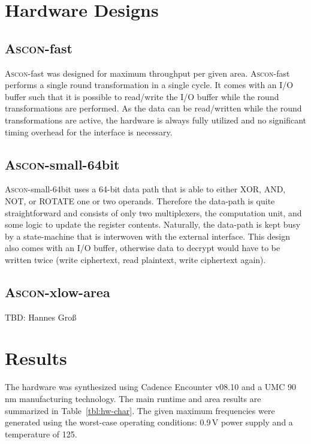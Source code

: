 \documentclass[runningheads]{llncs}
\begin{document}
\section{Hardware Designs}

\subsection{\textsc{Ascon}-fast}

\textsc{Ascon}-fast was designed for maximum throughput per given area.
\textsc{Ascon}-fast performs a single round transformation in a single cycle. It comes with an I/O buffer such that it is possible to read/write the I/O buffer while the round transformations are performed. As the data can be read/written while the round transformations are active, the hardware is always fully utilized and no significant timing overhead for the interface is necessary. 

\subsection{\textsc{Ascon}-small-64bit}

\textsc{Ascon}-small-64bit uses a 64-bit data path that is able to either XOR, AND, NOT, or ROTATE one or two operands. Therefore the data-path is quite straightforward and consists of only two multiplexers, the computation unit, and some logic to update the register contents. Naturally, the data-path is kept busy by a state-machine that is interwoven with the external interface. This design also comes with an I/O buffer, otherwise data to decrypt would have to be written twice (write ciphertext, read plaintext, write ciphertext again). 

\subsection{\textsc{Ascon}-xlow-area}

TBD: Hannes Gro{\ss}

\section{Results} \label{sec:results}

The hardware was synthesized using Cadence Encounter v08.10 and a UMC 90\,nm manufacturing technology. The main runtime and area results are summarized in Table~\ref{tbl:hw-char}.
The given maximum frequencies were generated using  the worst-case operating
conditions: 0.9\,V power supply and a temperature of 125\celsius.
\end{document}
